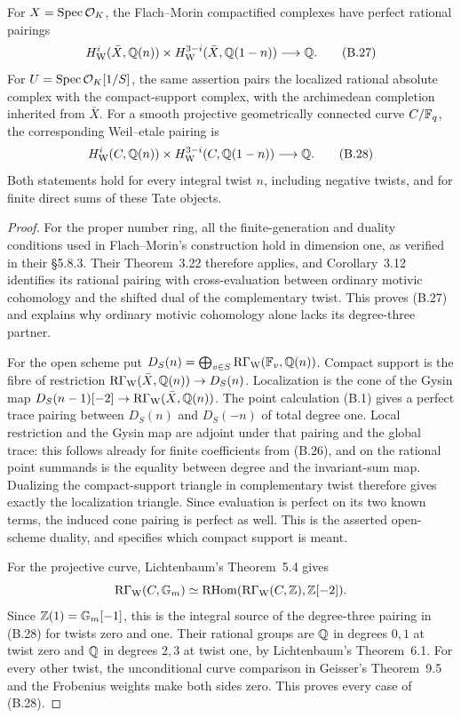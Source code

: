 \begin{theorem}
\label{thm:B-rational-duality}
For \(X=\operatorname{Spec}\mathcal O_K\), the Flach--Morin compactified
complexes have perfect rational pairings
\[
 H^i_{\mathrm W}(\bar X,\mathbb Q(n))\times
 H^{3-i}_{\mathrm W}(\bar X,\mathbb Q(1-n))\longrightarrow\mathbb Q.
 \tag{B.27}
\]
For \(U=\operatorname{Spec}\mathcal O_K[1/S]\), the same assertion pairs
the localized rational absolute complex with the compact-support
complex, with the archimedean completion inherited from \(\bar X\).
For a smooth projective geometrically connected curve \(C/\mathbb F_q\),
the corresponding Weil--etale pairing is
\[
 H^i_{\mathrm W}(C,\mathbb Q(n))\times H^{3-i}_{\mathrm W}(C,\mathbb Q(1-n))
 \longrightarrow\mathbb Q.
 \tag{B.28}
\]
Both statements hold for every integral twist \(n\), including
negative twists, and for finite direct sums of these Tate objects.
\end{theorem}
\begin{proof}
For the proper number ring, all the finite-generation and duality
conditions used in Flach--Morin's construction hold in dimension
one, as verified in their \S5.8.3.  Their Theorem~3.22 therefore
applies, and Corollary~3.12 identifies its rational pairing with
cross-evaluation between ordinary motivic cohomology and the shifted
dual of the complementary twist.  This proves (B.27) and explains
why ordinary motivic cohomology alone lacks its degree-three partner.

For the open scheme put
\(D_S(n)=\bigoplus_{v\in S}\operatorname{R\Gamma}_{\mathrm W}(\mathbb F_v,\mathbb Q(n))\).
Compact support is the fibre of restriction
\(\operatorname{R\Gamma}_{\mathrm W}(\bar X,\mathbb Q(n))\to D_S(n)\).
Localization is the cone of the Gysin map
\(D_S(n-1)[-2]\to\operatorname{R\Gamma}_{\mathrm W}(\bar X,\mathbb Q(n))\).
The point calculation (B.1) gives a perfect trace pairing between
\(D_S(n)\) and \(D_S(-n)\) of total degree one.  Local
restriction and the Gysin map are adjoint under that pairing and
the global trace: this follows already for finite coefficients from
(B.26), and on the rational point summands is the equality between
degree and the invariant-sum map.  Dualizing the compact-support
triangle in complementary twist therefore gives exactly the
localization triangle.  Since evaluation is perfect on its two
known terms, the induced cone pairing is perfect as well.  This is
the asserted open-scheme duality, and specifies which compact
support is meant.

For the projective curve, Lichtenbaum's Theorem~5.4 gives
\[
 \operatorname{R\Gamma}_{\mathrm W}(C,{\mathbb G_m})\simeq
 \operatorname{RHom}(\operatorname{R\Gamma}_{\mathrm W}(C,\mathbb Z),\mathbb Z[-2]).
\]
Since \(\mathbb Z(1)={\mathbb G_m}[-1]\), this is the integral source of
the degree-three pairing in (B.28) for twists zero and one.
Their rational groups are \(\mathbb Q\) in degrees \(0,1\) at twist
zero and \(\mathbb Q\) in degrees \(2,3\) at twist one, by
Lichtenbaum's Theorem~6.1.  For every other twist, the unconditional
curve comparison in Geisser's Theorem~9.5 and the Frobenius weights
make both sides zero.  This proves every case of (B.28).
\end{proof}

